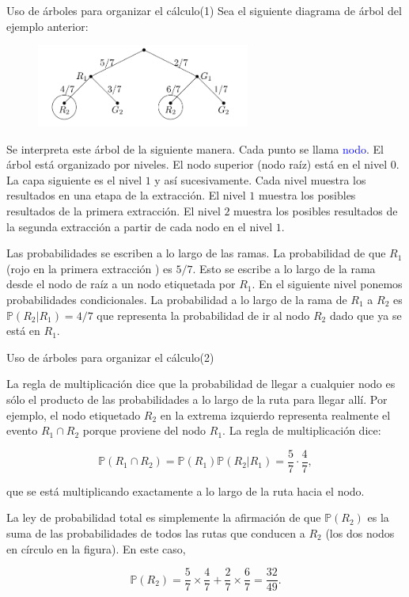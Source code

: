 \documentclass[10pt]{beamer}
\begin{document}
\begin{frame}{Uso de \'arboles para organizar el c\'alculo(1)}
Sea el siguiente diagrama de \'arbol del ejemplo anterior:

\begin{figure}[h]
	\centering
	\includegraphics[width=7cm]{g4}
\end{figure}

\scriptsize{Se interpreta este \'arbol de la siguiente manera. Cada punto se llama \textcolor{blue}{nodo}. El \'arbol est\'a organizado por niveles. El nodo superior (nodo ra\'iz) est\'a en el nivel $0$. La capa siguiente es el nivel $1$ y as\'i sucesivamente. Cada nivel muestra los resultados en una etapa de la extracci\'on. El nivel $1$ muestra los posibles resultados de la primera extracci\'on. El nivel $2$ muestra los posibles resultados de la segunda extracci\'on   a partir de cada nodo en el nivel $1$.

\vspace{0.2cm}

Las probabilidades se escriben a lo largo de las ramas. La probabilidad de que $R_1$ (rojo en la primera extracci\'on ) es $5/7$. Esto se  escribe a lo largo de la rama desde el nodo de ra\'iz a un nodo  etiquetada por  $R_1$. En el siguiente nivel ponemos probabilidades condicionales. La probabilidad a lo largo de la rama de $R_1$ a $R_2$ es $\mathbb{P}(R_2|R_1) = 4/7$ que representa la probabilidad de ir al nodo $R_2$ dado que ya se est\'a en $R_1$.}
\end{frame}

\begin{frame}{Uso de \'arboles para organizar el c\'alculo(2)}
\small{La regla de multiplicaci\'on dice que la probabilidad de llegar a cualquier nodo es s\'olo el producto de las probabilidades a lo largo de la ruta  para llegar all\'i. Por ejemplo, el nodo etiquetado $R_2$ en la extrema izquierdo representa realmente el evento $R_1 \cap R _2$ porque proviene del nodo $R_1$. La regla de multiplicaci\'on dice:
	
	
\[
\mathbb{P}(R_1 \cap R _2) = \mathbb{P}(R_1)\mathbb{P}(R_2|R_1 ) = \frac{5}{7}\cdot\frac{4}{7},
\]	

que  se est\'a multiplicando exactamente a lo largo de la ruta  hacia el nodo.

\vspace{0.2cm}

La ley de probabilidad total es simplemente la afirmaci\'on de que $\mathbb{P}(R_2)$ es la suma de las probabilidades de todos las rutas  que conducen a $R_2$ (los dos nodos en c\'irculo en la figura). En este caso,

\[
\mathbb{P}(R_2) = \frac{5}{7}\times \frac{4}{7} + \frac{2}{7}\times\frac{6}{7} = \frac{32}{49}.
\]
}
\end{frame}
\end{document}

